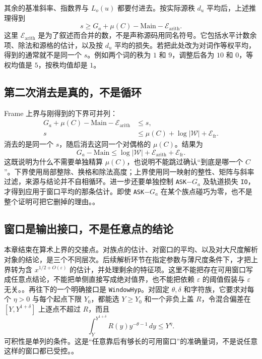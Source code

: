 其余的基准斜率、指数界与 $L_o(u)$ 都要付进去。按实际源秩 $d_u$ 平均后，上述推理得到
\[
       s\ge G_a+\mu(C)-\mathrm{Main}-\mathcal E_{\mathrm{arith}}.
\]
这里 $\mathcal E_{\mathrm{arith}}$ 是为了叙述而合并的数，不是声称源码用同名符号。它包括水平计数余项、除法和源格的估计，以及按 $d_u$ 平均的损失。若把此处改为对词作等权平均，得到的通常就不是同一个 $s$。例如两个词的秩为 $1$ 和 $9$，调整后各为 $10$ 和 $0$，等权均值是 $5$，按秩均值却是 $1$。

\subsection{第二次消去是真的，不是循环}
Frame 上界与刚得到的下界可并列：
\[
\begin{aligned}
  G_a+\mu(C)-\mathrm{Main}-\mathcal E_{\mathrm{arith}}
      &\le s,\\
  s &\le \mu(C)+\log|\mathcal W|+\mathcal E_{\mathrm{fr}} .
\end{aligned}
\]
消去的是同一个 $s$，随后消去这同一个对偶格的 $\mu(C)$。结果为
\[
 G_a-\mathrm{Main}\le\log|\mathcal W|
      +\mathcal E_{\mathrm{arith}}+\mathcal E_{\mathrm{fr}}.
\]
这既说明为什么不需要单独精算 $\mu(C)$，也说明不能跳过确认“到底是哪一个 $C$”。下界使用局部整除、换格和除法高度；上界使用同一映射的整性、矩阵与斜率过滤，来源与结论并不自相循环。进一步还要单独控制 \texttt{ASK}$-G_a$ 及轨道损失 \texttt{IO}，才得到应用于窗口平均的那条估计。即使 \texttt{ASK}$-G_a$ 在某个族点碰巧为零，也不是整个证明可把它删掉的理由。。

\subsection{窗口是输出接口，不是任意点的结论}
本章结束在算术上界的交接点。对族点的估计、对窗口的平均、以及对大尺度解析对象的结论，是三个不同层次。后续解析环节在指定参数与薄尺度条件下，才把上界转为含 $x^{1/2+O(\varepsilon)}$ 的估计，并处理剩余的特征项。这里不能把存在可用窗口写成任意点结论，不能把单侧直接写成绝对值界，也不能把依赖 $\varepsilon$ 的阈值假装与 $\varepsilon$ 无关。。再往下的一个明确接口是 \texttt{WindowHyp}。对固定 $\theta,\delta$ 和字符族，它要求对每个 $\eta>0$ 与每个起点下限 $Y_0$，都能选 $Y\ge Y_0$ 和一个非负上盖 $R$，令混合偏差在 $[Y,Y^{1+\delta}]$ 上逐点不超过 $R$，而且
\[
       \int_Y^{Y^{1+\delta}}R(y)y^{-\theta-1}\,dy\le Y^\eta .
\]
可积性是单列的条件。这是“任意靠后有够长的可用窗口”的准确量词，不是说任意这样的窗口都已受控。。

